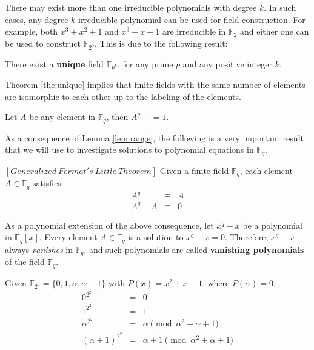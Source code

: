 
There may exist more than one irreducible polynomials with degree $k$. In such cases, any degree $k$ irreducible polynomial can be 
used for field construction. For example, both $x^3+x^2+1$ and $x^3+x+1$ are irreducible in $\mathbb{F}_2$ and either one can be used
to construct $\mathbb{F}_{2^3}$. This is due to the following result:

\begin{Theorem}\label{the:unique}
There exist a {\bf unique} field $\mathbb{F}_{p^k}$, for any prime $p$ and any positive integer $k$.
\end{Theorem}

Theorem \ref{the:unique} implies that finite fields with the same number of elements are isomorphic to each other up to the labeling of the elements. 


\begin{Lemma}\label{lem:range}
Let $A$ be any element in $\mathbb{F}_{q}$, then $A^{q-1}=1$. 
\end{Lemma}

As a consequence of Lemma \ref{lem:range}, the following is a very important result that we will use
to investigate solutions to polynomial equations in $\mathbb{F}_{q}$. 

 \begin{Theorem}\label{the:fer}
 $\left[Generalized\  Fermat's\  Little\  Theorem \right]$ Given a
 finite field $\mathbb{F}_{q}$, each element $A \in \mathbb{F}_{q}$ satisfies: 
 \begin{eqnarray}\label{fe}
 A^{q} & \equiv & A  \nonumber \\
 A^{q} - A & \equiv& 0  
 \end{eqnarray}
 \end{Theorem} 

As a polynomial extension of the above consequence, let $x^q-x$ be a polynomial in $\mathbb{F}_{q}[x]$.
Every element $A \in \mathbb{F}_{q}$ is a solution to  $x^q-x=0$. 
Therefore, $x^{q} - x$ always {\it vanishes} in $\mathbb{F}_{q}$, and such polynomials are called 
{\bf vanishing polynomials} of the field $\mathbb{F}_{q}$.

\begin{Example}
Given $\mathbb{F}_{2^2} =\{0,1,\alpha,\alpha+1\}$ with $P(x)=x^2+x+1$, where $P(\alpha)=0$. 
 \begin{eqnarray}
 0^{2^2}&=&0 \nonumber \\
 1^{2^2}&=&1 \nonumber \\
 \alpha^{2^2}&=&\alpha \pmod {\alpha^2+\alpha+1}\nonumber \\
 (\alpha+1)^{2^2}&=&\alpha+1 \pmod {\alpha^2+\alpha+1} \nonumber 
 \end{eqnarray}
\end{Example}

